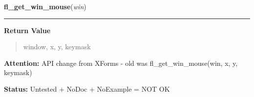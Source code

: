 \hspace{.8\funcindent}\begin{boxedminipage}{\funcwidth}

    \raggedright \textbf{fl\_get\_win\_mouse}(\textit{win})

    \vspace{-1.5ex}

    \rule{\textwidth}{0.5\fboxrule}
\setlength{\parskip}{2ex}
\setlength{\parskip}{1ex}
      \textbf{Return Value}
    \vspace{-1ex}

      \begin{quote}
      window, x, y, keymask

      \end{quote}

\textbf{Attention:} API change from XForms - old was fl\_get\_win\_mouse(win, x, y, keymask)



\textbf{Status:} Untested + NoDoc + NoExample = NOT OK



    \end{boxedminipage}

    \label{xformslib:library:fl_get_form_mouse}

    \vspace{0.5ex}

